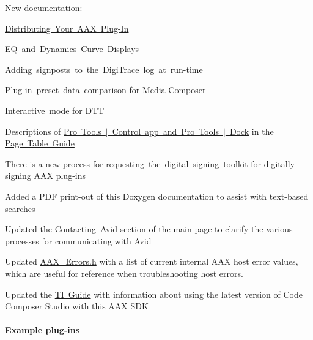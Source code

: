 \begin{DoxyItemize}
\item New documentation\+: 
\begin{DoxyItemize}
\item \mbox{\hyperlink{a00843}{Distributing Your A\+AX Plug-\/\+In}} 
\item \mbox{\hyperlink{a00812}{EQ and Dynamics Curve Displays}} 
\item \mbox{\hyperlink{a00834_digitrace__signposting}{Adding signposts to the Digi\+Trace log at run-\/time}} 
\item \mbox{\hyperlink{a00831_subsubsection__aax_media_composer_guide__features__presets__comparison}{Plug-\/in preset data comparison}} for Media Composer 
\item \mbox{\hyperlink{a00836_dtt_guide_04_interactive_mode}{Interactive mode}} for \mbox{\hyperlink{a00836}{D\+TT}} 
\item Descriptions of \mbox{\hyperlink{a00833_subsubsection__avid_ptcontrol}{Pro Tools $\vert$ Control app and Pro Tools $\vert$ Dock}} in the \mbox{\hyperlink{a00833}{Page Table Guide}} 
\end{DoxyItemize}
\item There is a new process for \mbox{\hyperlink{a00830_subsection__digital_signature_}{requesting the digital signing toolkit}} for digitally signing A\+AX plug-\/ins 
\item Added a P\+DF print-\/out of this Doxygen documentation to assist with text-\/based searches  
\item Updated the \mbox{\hyperlink{a00793_contact}{Contacting Avid}} section of the main page to clarify the various processes for communicating with Avid  
\item Updated \mbox{\hyperlink{a00494}{A\+A\+X\+\_\+\+Errors.\+h}} with a list of current internal A\+AX host error values, which are useful for reference when troubleshooting host errors.  
\item Updated the \mbox{\hyperlink{a00832}{TI Guide}} with information about using the latest version of Code Composer Studio with this A\+AX S\+DK  
\end{DoxyItemize}\hypertarget{a00847_aax_sdk_2p3p0_ExamplePlugIns}{}\paragraph{Example plug-\/ins}\label{a00847_aax_sdk_2p3p0_ExamplePlugIns}

